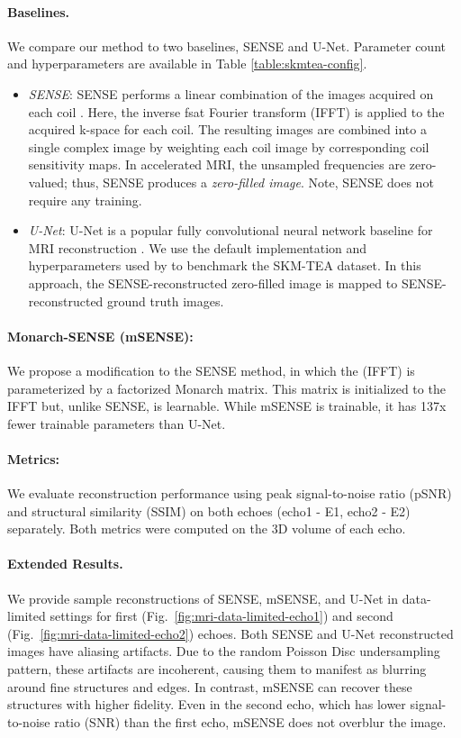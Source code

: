 \paragraph{Baselines.} We compare our method to two baselines, SENSE and U-Net. Parameter count and hyperparameters are available in Table \ref{table:skmtea-config}.
\begin{itemize}
    \item \textit{SENSE}: SENSE performs a linear combination of the images acquired on each coil \citep{pruessmann1999sense}. Here, the inverse fsat Fourier transform (IFFT) is applied to the acquired k-space for each coil. The resulting images are combined into a single complex image by weighting each coil image by corresponding coil sensitivity maps. In accelerated MRI, the unsampled frequencies are zero-valued; thus, SENSE produces a \textit{zero-filled image}. Note, SENSE does not require any training.
    \item \textit{U-Net}: U-Net is a popular fully convolutional neural network baseline for MRI reconstruction \citep{ronneberger2015u}. We use the default implementation and hyperparameters used by \citet{desai2021skm} to benchmark the SKM-TEA dataset. In this approach, the SENSE-reconstructed zero-filled image is mapped to SENSE-reconstructed ground truth images.
\end{itemize}

\paragraph{Monarch-SENSE (mSENSE):} We propose a modification to the SENSE method, in which the (IFFT) is parameterized by a factorized Monarch matrix. This matrix is initialized to the IFFT but, unlike SENSE, is learnable. While mSENSE is trainable, it has 137x fewer trainable parameters than U-Net.

\paragraph{Metrics:} We evaluate reconstruction performance using peak signal-to-noise ratio (pSNR) and structural similarity (SSIM) on both echoes (echo1 - E1, echo2 - E2) separately. Both metrics were computed on the 3D volume of each echo.

\paragraph{Extended Results.} We provide sample reconstructions of SENSE, mSENSE, and U-Net in data-limited settings for first (Fig.~\ref{fig:mri-data-limited-echo1}) and second (Fig.~\ref{fig:mri-data-limited-echo2}) echoes. Both SENSE and U-Net reconstructed images have aliasing artifacts. Due to the random Poisson Disc undersampling pattern, these artifacts are incoherent, causing them to manifest as blurring around fine structures and edges. In contrast, mSENSE can recover these structures with higher fidelity. Even in the second echo, which has lower signal-to-noise ratio (SNR) than the first echo, mSENSE does not overblur the image.

